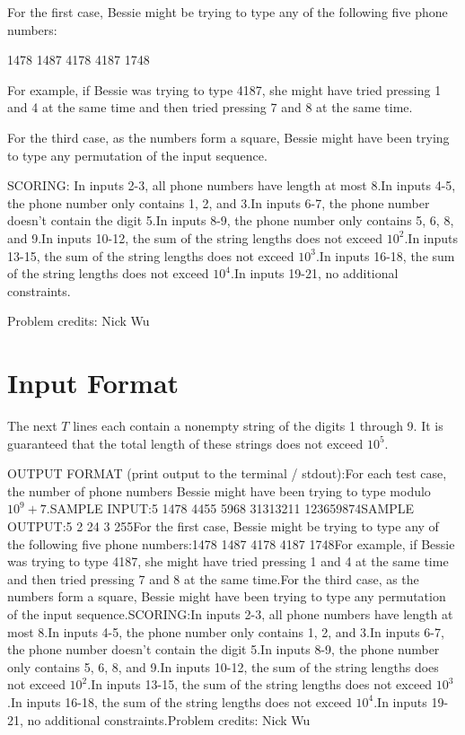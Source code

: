 \documentclass[12pt]{article}
\begin{document}
For the first case, Bessie might be trying to type any of the following five
phone numbers:


1478
1487
4178
4187
1748

For example, if Bessie was trying to type 4187, she might have tried pressing 1
and 4 at the same time and then tried pressing 7 and 8 at the same time.

For the third case, as the numbers form a square, Bessie might have been trying
to type any permutation of the input sequence.

SCORING:
In inputs 2-3, all phone numbers have length at most $8$.In inputs 4-5, the phone number only contains 1, 2, and 3.In inputs 6-7, the phone number doesn't contain the digit 5.In inputs 8-9, the phone number only contains 5, 6, 8, and 9.In inputs 10-12, the sum of the string lengths does not exceed $10^2$.In inputs 13-15, the sum of the string lengths does not exceed $10^3$.In inputs 16-18, the sum of the string lengths does not exceed $10^4$.In inputs 19-21, no additional constraints.


Problem credits: Nick Wu



\section*{Input Format}
The next $T$ lines each contain a nonempty string of the digits 1 through 9. It
is guaranteed that the total length of these strings does not exceed $10^5$.

OUTPUT FORMAT (print output to the terminal / stdout):For each test case, the number of phone numbers Bessie might have been trying to
type modulo $10^9+7$.SAMPLE INPUT:5
1478
4455
5968
31313211
123659874SAMPLE OUTPUT:5
2
24
3
255For the first case, Bessie might be trying to type any of the following five
phone numbers:1478
1487
4178
4187
1748For example, if Bessie was trying to type 4187, she might have tried pressing 1
and 4 at the same time and then tried pressing 7 and 8 at the same time.For the third case, as the numbers form a square, Bessie might have been trying
to type any permutation of the input sequence.SCORING:In inputs 2-3, all phone numbers have length at most $8$.In inputs 4-5, the phone number only contains 1, 2, and 3.In inputs 6-7, the phone number doesn't contain the digit 5.In inputs 8-9, the phone number only contains 5, 6, 8, and 9.In inputs 10-12, the sum of the string lengths does not exceed $10^2$.In inputs 13-15, the sum of the string lengths does not exceed $10^3$.In inputs 16-18, the sum of the string lengths does not exceed $10^4$.In inputs 19-21, no additional constraints.Problem credits: Nick Wu
\end{document}
